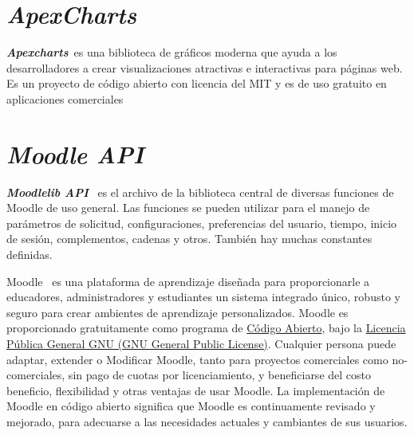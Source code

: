 \section{\textit{ApexCharts}}
\textbf{\textit{Apexcharts}}~\cite{ApexChart}es una biblioteca de gráficos moderna que ayuda a los desarrolladores a crear visualizaciones atractivas e interactivas para páginas web.
Es un proyecto de código abierto con licencia del MIT y es de uso gratuito en aplicaciones comerciales

\section{\textit{Moodle API}}
\textbf{\textit{Moodlelib API}}~\cite{MoodleAPI} es el archivo de la biblioteca central de diversas funciones de Moodle de uso general. Las funciones se pueden utilizar para el manejo de parámetros de solicitud, configuraciones, preferencias del usuario, tiempo, inicio de sesión, complementos, cadenas y otros. También hay muchas constantes definidas.

Moodle~\cite{Moodle} es una plataforma de aprendizaje diseñada para proporcionarle a educadores, administradores y estudiantes un sistema integrado único, robusto y seguro para crear ambientes de aprendizaje personalizados. 
Moodle es proporcionado gratuitamente como programa de \href{https://opensource.org/docs/osd}{Código Abierto}, bajo la \href{https://docs.moodle.org/dev/License}{Licencia Pública General GNU (GNU General Public License)}. Cualquier persona puede adaptar, extender o Modificar Moodle, tanto para proyectos comerciales como no-comerciales, sin pago de cuotas por licenciamiento, y beneficiarse del costo beneficio, flexibilidad y otras ventajas de usar Moodle. La implementación de Moodle en código abierto significa que Moodle es continuamente revisado y mejorado, para adecuarse a las necesidades actuales y cambiantes de sus usuarios.



